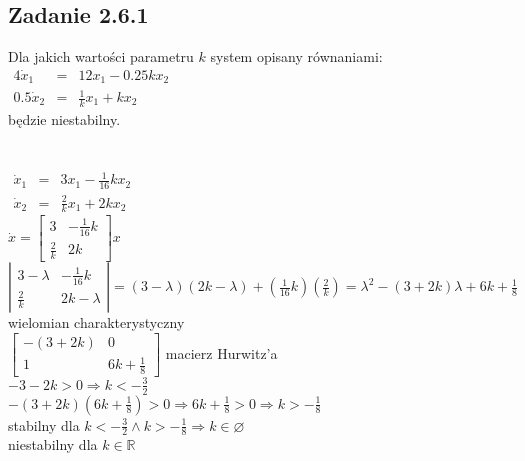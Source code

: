 \subsection*{Zadanie 2.6.1} {\color{darkgray}
	Dla jakich wartości parametru $k$ system opisany równaniami:\\
	$\begin{array}{rcl}4\dot{x}_1&=&12x_1-0.25kx_2  \\  0.5\dot{x}_2&=&\frac 1kx_1+kx_2\end{array}$\\
	będzie niestabilny.\\
}\lineh
\\\\
$\begin{array}{rcl}\dot{x}_1&=&3x_1-\frac{1}{16}kx_2  \\  \dot{x}_2&=&\frac 2kx_1+2kx_2\end{array}$\\
$\dot{x}=\left[\begin{array}{cc}3&-\frac{1}{16}k\\\frac{2}{k}&2k\end{array}\right]x$\\
$\left|\begin{array}{cc}3-\lambda&-\frac{1}{16}k\\\frac{2}{k}&2k-\lambda\end{array}\right|=(3-\lambda)(2k-\lambda)+(\frac{1}{16}k)(\frac{2}{k})=\lambda^2-(3+2k)\lambda+6k+\frac{1}{8}$ wielomian charakterystyczny\\
$\left[\begin{array}{cc}-(3+2k) &0\\1&6k+\frac 18\end{array}\right]$ macierz Hurwitz'a\\
$-3-2k>0\Rightarrow k<-\frac 32$\\
$-(3+2k)(6k+\frac 18)>0 \Rightarrow 6k+\frac 18>0\Rightarrow k>-\frac 18$\\
stabilny dla $k<-\frac 32 \wedge k>-\frac 18 \Rightarrow k\in \varnothing$\\
niestabilny dla $k \in \mathbb{R}$




\pagebreak
